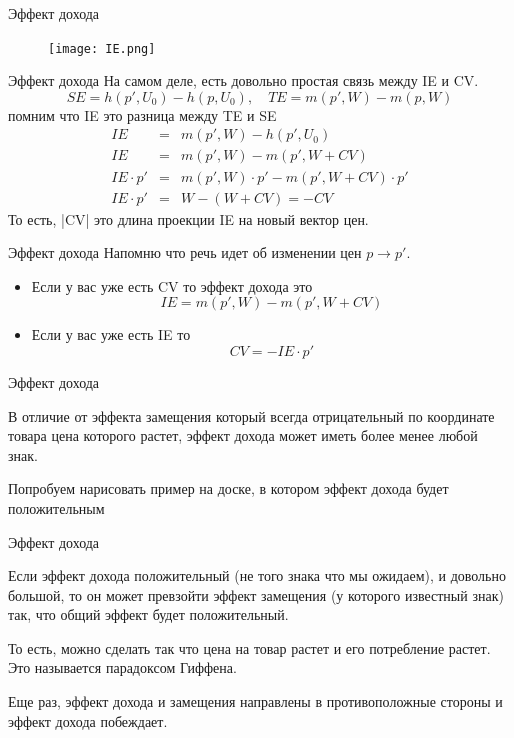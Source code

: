 \documentclass{beamer}
\begin{document}
\begin{frame}{Эффект дохода}

\begin{figure}[hbt]
\centering
\texttt{[image: IE.png]}
\end{figure}

\end{frame}

\begin{frame}{Эффект дохода}
На самом деле, есть довольно простая связь между IE и CV.
$$ SE = h(p', U_0) - h(p, U_0), \quad TE = m(p',W) - m(p,W)$$
помним что IE это разница между TE и SE
\begin{eqnarray*}
IE & = & m(p', W) - h(p', U_0)\\
IE & = & m(p', W) - m(p', W + CV)\\
IE \cdot p' & = & m(p', W)\cdot p' - m(p', W + CV)\cdot p' \\
IE \cdot p' & = & W - (W + CV) = - CV
\end{eqnarray*}
То есть, |CV| это длина проекции IE на новый вектор цен.
\end{frame}


\begin{frame}{Эффект дохода}
Напомню что речь идет об изменении цен $p \to p'$.
\begin{itemize}
  \item Если у вас уже есть CV то эффект дохода это
  $$ IE = m(p', W) - m(p', W + CV)$$
  \item Если у вас уже есть IE то
  $$ CV = - IE \cdot p'$$
\end{itemize}
\end{frame}

\begin{frame}{Эффект дохода}

В отличие от эффекта замещения который всегда отрицательный по координате товара цена которого растет, эффект дохода может иметь более менее любой знак.

Попробуем нарисовать пример на доске, в котором эффект дохода будет положительным

\end{frame}

\begin{frame}{Эффект дохода}

Если эффект дохода положительный (не того знака что мы ожидаем), и довольно большой, то он может превзойти эффект замещения (у которого известный знак) так, что общий эффект будет положительный.

То есть, можно сделать так что цена на товар растет и его потребление растет. Это называется \alert{парадоксом Гиффена}.

Еще раз, эффект дохода и замещения направлены в противоположные стороны и эффект дохода побеждает.

\end{frame}
\end{document}
